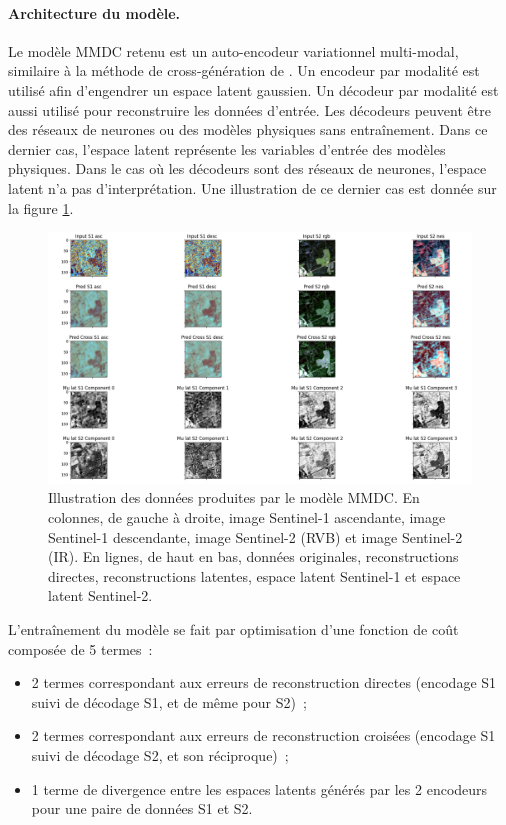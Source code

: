 \paragraph{Architecture du modèle.}
Le modèle MMDC retenu est un auto-encodeur variationnel multi-modal, similaire à la méthode de cross-génération de \cite{shi-2019-variat-mixtur}. Un encodeur par modalité est utilisé afin d’engendrer un espace latent gaussien. Un décodeur par modalité est aussi utilisé pour reconstruire les données d’entrée. Les décodeurs peuvent être des réseaux de neurones ou des modèles physiques sans entraînement. Dans ce dernier cas, l’espace latent représente les variables d’entrée des modèles physiques. Dans le cas où les décodeurs sont des réseaux de neurones, l’espace latent n’a pas d’interprétation. Une illustration de ce dernier cas est donnée sur la figure \ref{fig:mmdcresults}.

\begin{figure}[htbp]
\begin{center}
\includegraphics[width=\columnwidth]{img/wp1/mmdc5.png}
\caption{Illustration des données produites par le modèle MMDC. En colonnes, de gauche à droite, image Sentinel-1 ascendante, image Sentinel-1 descendante, image Sentinel-2 (RVB) et image Sentinel-2 (IR). En lignes, de haut en bas, données originales, reconstructions directes, reconstructions latentes, espace latent Sentinel-1 et espace latent Sentinel-2.}
\label{fig:mmdcresults}
\end{center}
\end{figure}
L’entraînement du modèle se fait par optimisation d’une fonction de coût composée de 5 termes :
\begin{itemize}
\item 2 termes correspondant aux erreurs de reconstruction directes (encodage S1 suivi de décodage S1, et de même pour S2) ;
\item 2 termes correspondant aux erreurs de reconstruction croisées (encodage S1 suivi de décodage S2, et son réciproque) ;
\item 1 terme de divergence entre les espaces latents générés par les 2 encodeurs pour une paire de données S1 et S2.\\
\end{itemize}

